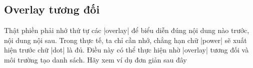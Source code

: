 
\subsection{Overlay \texorpdfstring{tương đối}{tuong doi}}
Thật phiền phải nhớ thứ tự các |overlay| để biểu diễn đúng nội dung nào
trước, nội dung nội sau. 
Trong thực tế, ta chỉ cần nhớ, chẳng hạn chữ |power| sẽ xuất hiện
trước chữ |dot| là đủ. Điều này có thể thực hiện nhờ |overlay| tương đối
và môi trường tạo danh sách. Hãy xem ví dụ đơn giản sau đây

